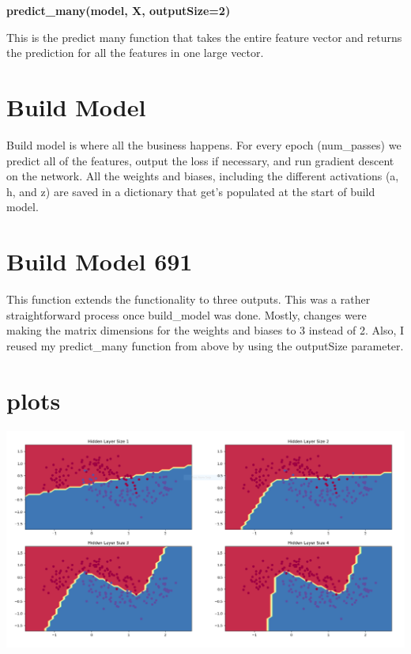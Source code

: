 \documentclass{article}
\begin{document}
\textbf{predict\_many(model, X, outputSize=2)} 

This is the predict many function that takes the entire feature vector and returns the prediction for all the features in one large vector. 

\section*{Build Model} 

Build model is where all the business happens. For every epoch (num\_passes) we predict all of the features, output the loss if necessary, and run gradient descent on the network. All the weights and biases, including the different activations (a, h, and z) are saved in a dictionary that get's populated at the start of build model. 

\section*{Build Model 691}

This function extends the functionality to three outputs. This was a rather straightforward process once build\_model was done. Mostly, changes were making the matrix dimensions for the weights and biases to 3 instead of 2. Also, I reused my predict\_many function from above by using the outputSize parameter. 

\section*{plots} 

\includegraphics[width=\textwidth]{nn.png}
\end{document}
